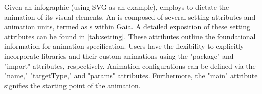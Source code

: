 

Given an infographic (using SVG as an example), \gaia{} employs \aniclass{} to dictate the animation of its visual elements. An \aniclass{} is composed of several setting attributes and animation units, termed as \aniunit{}s within Gaia. A detailed exposition of these setting attributes can be found in \autoref{tab:setting}. 
These attributes outline the foundational information for animation specification. Users have the flexibility to explicitly incorporate libraries and their custom animations using the "package" and "import" attributes, respectively. Animation configurations can be defined via the "name," "targetType," and "params" attributes. Furthermore, the "main" attribute signifies the starting point of the animation.



